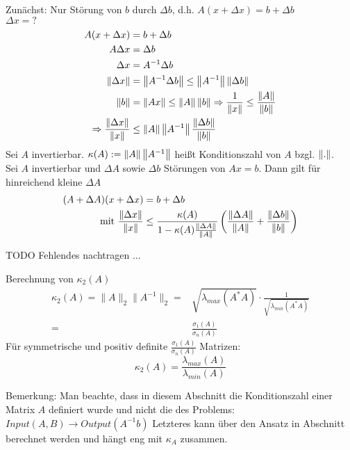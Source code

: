Zunächst: Nur Störung von $b$ durch $\Delta b$, d.h. $A(x + \Delta x) = b + \Delta b$\\
$\Delta x = ?$
\begin{align*}
  A (x + \Delta x) &= b + \Delta b\\
  A \Delta x &= \Delta b\\
  \Delta x &= A^{-1} \Delta b\\
  \left\lVert \Delta x \right\rVert &= \left\lVert  A^{-1} \Delta b  \right\rVert \leq \left\lVert A^{-1} \right\rVert \left\lVert \Delta b \right\rVert\\
  \left\lVert b \right\rVert &= \left\lVert Ax \right\rVert \leq \left\lVert A \right\rVert\left\lVert b \right\rVert \Rightarrow \frac{1}{\left\lVert x \right\rVert} \leq \frac{\left\lVert A \right\rVert}{\left\lVert b \right\rVert} \\
  \Rightarrow \frac{\left\lVert \Delta x \right\rVert}{\left\lVert x \right\rVert} &\leq \left\lVert A \right\rVert\left\lVert A^{-1} \right\rVert\frac{\left\lVert \Delta b \right\rVert}{\left\lVert b \right\rVert} 
\end{align*}
 Sei $A$ invertierbar. $\kappa(A) := \left\lVert A \right\rVert\left\lVert A^{-1} \right\rVert$ heißt Konditionszahl von $A$ bzgl. $\left\lVert . \right\rVert$.\\
\satz Sei $A$ invertierbar und $\Delta A$ sowie $\Delta b$ Störungen von $Ax=b$.
Dann gilt für hinreichend kleine $\Delta A$
\begin{align*}
  (A+\Delta A)(x + \Delta x) &= b + \Delta b\\
  \text{mit } \frac{\left\lVert \Delta x \right\rVert}{\left\lVert x \right\rVert} &\leq \frac{\kappa(A)}{1-\kappa(A)\frac{\left\lVert \Delta A \right\rVert}{\left\lVert A \right\rVert} } \left( \frac{\left\lVert \Delta A \right\rVert}{\left\lVert A \right\rVert} + \frac{\left\lVert \Delta b \right\rVert}{\left\lVert b \right\rVert} \right)
\end{align*}

TODO Fehlendes nachtragen
...

Berechnung von $\kappa_2\left(A\right)$
\begin{equation*}
  \begin{aligned}
    \kappa_2(A) = \|A\|_2 \|A^{-1}\|_2 = &\sqrt{\lambda_{max}\left(A^*A\right)} \cdot \frac{1}{\sqrt{\lambda_{min}\left(A^*A\right)}} \\
    = &\frac{\sigma_1\left(A\right)}{\sigma_n\left(A\right)}
  \end{aligned}
\end{equation*}
Für symmetrische und positiv definite $\frac{\sigma_1\left(A\right)}{\sigma_n\left(A\right)}$ Matrizen:
\begin{equation*}
  \kappa_2(A) = \frac{\lambda_{max}\left(A\right)}{\lambda_{min}\left(A\right)}
\end{equation*}

Bemerkung: Man beachte, dass in diesem Abschnitt die Konditionszahl einer Matrix $A$ definiert wurde und nicht die des Problems:
$Input\left(A,B\right) \rightarrow Output\left(A^{-1}b\right)$
Letzteres kann über den Ansatz in Abschnitt  berechnet werden und hängt eng mit $\kappa_A$ zusammen.

